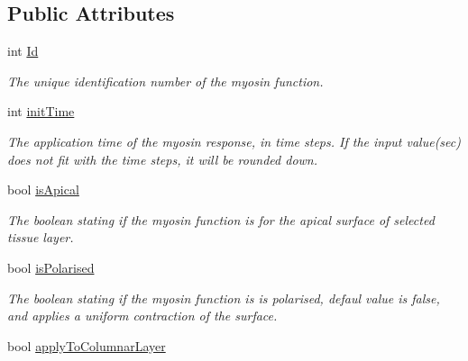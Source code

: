 \subsection*{Public Attributes}
\begin{DoxyCompactItemize}
\item 
\hypertarget{classMyosinFunction_a718e298e9ed8eee2b037fd08d7bd4373}{}int \hyperlink{classMyosinFunction_a718e298e9ed8eee2b037fd08d7bd4373}{Id}\label{classMyosinFunction_a718e298e9ed8eee2b037fd08d7bd4373}

\begin{DoxyCompactList}\small\item\em The unique identification number of the myosin function. \end{DoxyCompactList}\item 
\hypertarget{classMyosinFunction_a5bf0e10f1e37ef01762fe72305d2e4d2}{}int \hyperlink{classMyosinFunction_a5bf0e10f1e37ef01762fe72305d2e4d2}{init\+Time}\label{classMyosinFunction_a5bf0e10f1e37ef01762fe72305d2e4d2}

\begin{DoxyCompactList}\small\item\em The application time of the myosin response, in time steps. If the input value(sec) does not fit with the time steps, it will be rounded down. \end{DoxyCompactList}\item 
\hypertarget{classMyosinFunction_a413c9a88624a97f6483efebdc5ab6fac}{}bool \hyperlink{classMyosinFunction_a413c9a88624a97f6483efebdc5ab6fac}{is\+Apical}\label{classMyosinFunction_a413c9a88624a97f6483efebdc5ab6fac}

\begin{DoxyCompactList}\small\item\em The boolean stating if the myosin function is for the apical surface of selected tissue layer. \end{DoxyCompactList}\item 
\hypertarget{classMyosinFunction_a66bf31a5b46a19e67691d67b25c03852}{}bool \hyperlink{classMyosinFunction_a66bf31a5b46a19e67691d67b25c03852}{is\+Polarised}\label{classMyosinFunction_a66bf31a5b46a19e67691d67b25c03852}

\begin{DoxyCompactList}\small\item\em The boolean stating if the myosin function is is polarised, defaul value is false, and applies a uniform contraction of the surface. \end{DoxyCompactList}\item 
\hypertarget{classMyosinFunction_a6a978e5577af3f6b56edda5fd825d89c}{}bool \hyperlink{classMyosinFunction_a6a978e5577af3f6b56edda5fd825d89c}{apply\+To\+Columnar\+Layer}\label{classMyosinFunction_a6a978e5577af3f6b56edda5fd825d89c}


\end{DoxyCompactItemize}
